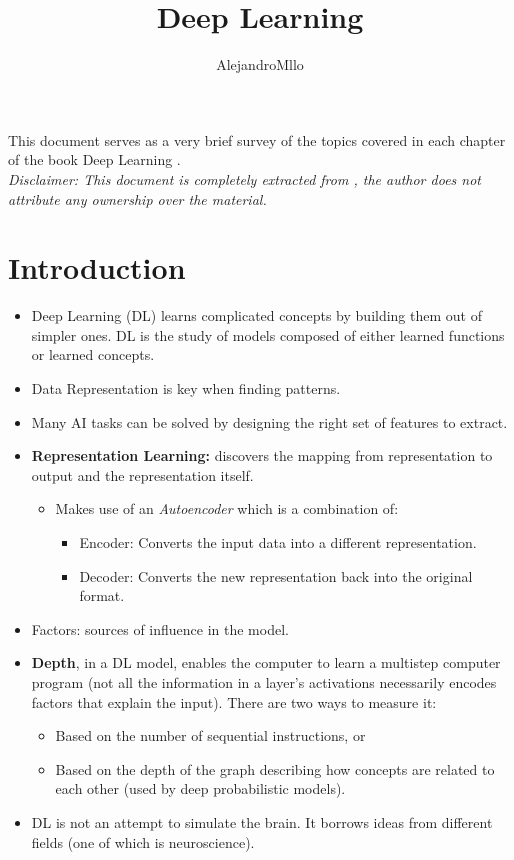 \documentclass{article}
\begin{document}
 

\title{Deep Learning}
\author{AlejandroMllo}
\date{}
\maketitle

This document serves as a very brief survey of the topics covered in each chapter of the book Deep Learning \cite{Goodfellow-et-al-2016}.\\

\small{
\textit{ Disclaimer: This document is completely extracted from \cite{Goodfellow-et-al-2016}, the author does not attribute any ownership over the material. }
}

\section{Introduction}
\begin{itemize}
\item Deep Learning (DL) learns complicated concepts by building them out of simpler ones. DL is the study of models composed of either learned functions or learned concepts.
\item Data Representation is key when finding patterns.
\item Many AI tasks can be solved by designing the right set of features to extract.
\item \textbf{Representation Learning:} discovers the mapping from representation to output and the representation itself.
\begin{itemize}
\item Makes use of an \textit{Autoencoder} which is a combination of:
\begin{itemize}
\item Encoder: Converts the input data into a different representation.
\item Decoder: Converts the new representation back into the original format.
\end{itemize}
\end{itemize}
\item Factors: sources of influence in the model.
\item \textbf{Depth}, in a DL model, enables the computer to learn a multistep computer program (not all the information in a layer's activations necessarily encodes factors that explain the input). There are two ways to measure it:
\begin{itemize}
\item Based on the number of sequential instructions, or
\item Based on the depth of the graph describing how concepts are related to each other (used by deep probabilistic models).
\end{itemize}
\item DL is not an attempt to simulate the brain. It borrows ideas from different fields (one of which is neuroscience).
\end{itemize}
\end{document}
